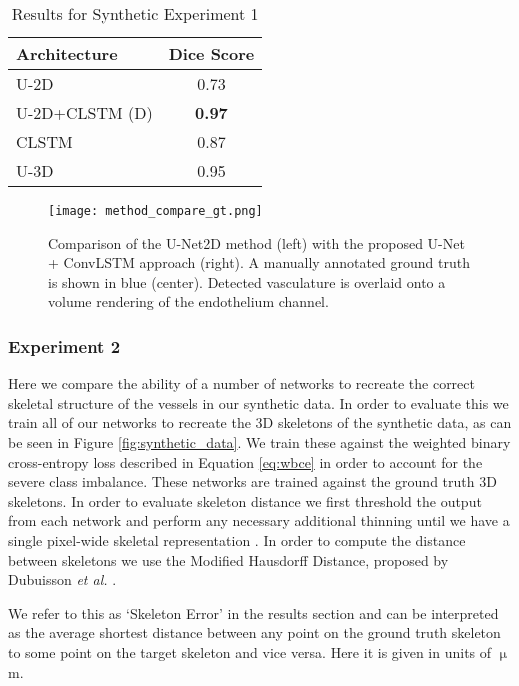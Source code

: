 \documentclass[journal,transmag]{IEEEtran}
\begin{document}
\begin{table}[h]
\centering
\begin{tabular}{l|c}
Architecture & Dice Score  \\
\hline
                U-2D & 0.73 \\
                U-2D+CLSTM (D)& \textbf{0.97} \\
                CLSTM & 0.87  \\
                U-3D &  0.95  \\
\end{tabular}
\caption{Results for Synthetic Experiment 1}
\label{tab:synth_seg_dice}
\end{table}

\begin{figure*}[t]
\texttt{[image: method\_compare\_gt.png]}
\caption{Comparison of the U-Net2D method (left) with the proposed U-Net + ConvLSTM approach (right). A manually annotated ground truth is shown in blue (center). Detected vasculature is overlaid onto a volume rendering of the endothelium channel.}
\label{fig:results_compare}
\end{figure*}

\subsubsection*{Experiment 2}
Here we compare the ability of a number of networks to recreate the correct skeletal structure of the vessels in our synthetic data. In order to evaluate this we train all of our networks to recreate the 3D skeletons of the synthetic data, as can be seen in Figure \ref{fig:synthetic_data}. We train these against the weighted binary cross-entropy loss described in Equation \ref{eq:wbce} in order to account for the severe class imbalance. These networks are trained against the ground truth 3D skeletons. In order to evaluate skeleton distance we first threshold the output from each network and perform any necessary additional thinning until we have a single pixel-wide skeletal representation \cite{Pudney1998}. In order to compute the distance between skeletons we use the Modified Hausdorff Distance, proposed by Dubuisson \emph{et al.} \cite{Dubuisson1994}.


We refer to this as `Skeleton Error' in the results section and can be interpreted as the average shortest distance between any point on the ground truth skeleton to some point on the target skeleton and vice versa. Here it is given in units of $\upmu$m.
\end{document}
